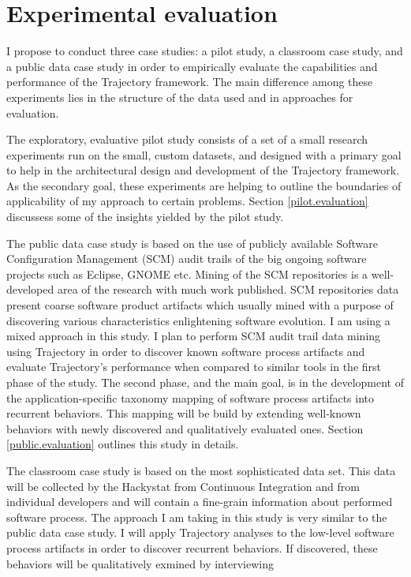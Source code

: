 \chapter{Experimental evaluation} \label{experiments}
I propose to conduct three case studies: a pilot study, a classroom case study, and a public data case study in order to empirically evaluate the capabilities and performance of the Trajectory framework. The main difference among these experiments lies in the structure of the data used and in approaches for evaluation. 

The exploratory, evaluative pilot study consists of a set of a small research experiments run on the small, custom datasets, and designed with a primary goal to help in the architectural design and development of the Trajectory framework. As the secondary goal, these experiments are helping to outline the boundaries of applicability of my approach to certain problems. Section \ref{pilot.evaluation} discussess some of the insights yielded by the pilot study.

The public data case study is based on the use of publicly available Software Configuration Management (SCM) audit trails of the big ongoing software projects such as Eclipse, GNOME etc. Mining of the SCM repositories is a well-developed area of the research with much work published. SCM repositories data present coarse software product artifacts which usually mined with a purpose of discovering various characteristics enlightening software evolution. I am using a mixed approach in this study. I plan to perform SCM audit trail data mining using Trajectory in order to discover known software process artifacts and evaluate Trajectory's performance when compared to similar tools in the first phase of the study. The second phase, and the main goal, is in the development of the application-specific taxonomy mapping of software process artifacts into recurrent behaviors. This mapping will be build by extending well-known behaviors with newly discovered and qualitatively evaluated ones. Section \ref{public.evaluation} outlines this study in details.

The classroom case study is based on the most sophisticated data set. This data will be collected by the Hackystat from Continuous Integration and from individual developers and will contain a fine-grain information about performed software process. The approach I am taking in this study is very similar to the public data case study. I will apply Trajectory analyses to the low-level software process artifacts in order to discover recurrent behaviors. If discovered, these behaviors will be qualitatively exmined by interviewing 


